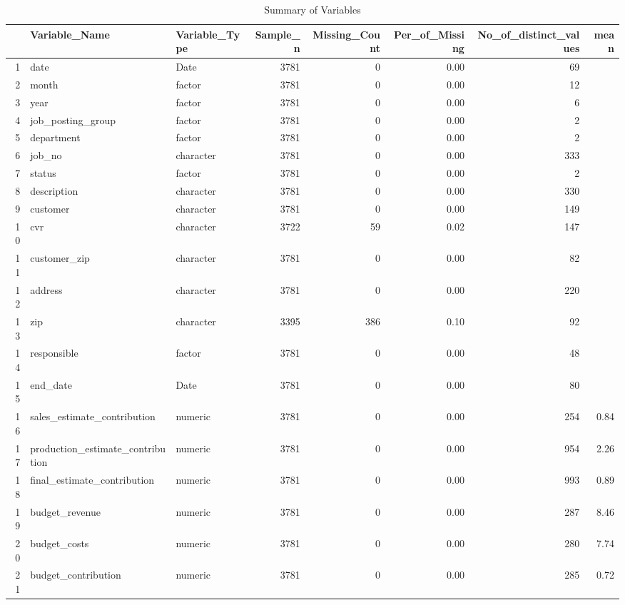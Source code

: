\begin{sidewaystable}[ht]
\centering
\caption{Summary of Variables} 
\begin{tabular}{rllrrrrr}
  \hline
 & Variable\_Name & Variable\_Type & Sample\_n & Missing\_Count & Per\_of\_Missing & No\_of\_distinct\_values & mean \\ 
  \hline
1 & date & Date & 3781 &   0 & 0.00 &  69 &  \\ 
  2 & month & factor & 3781 &   0 & 0.00 &  12 &  \\ 
  3 & year & factor & 3781 &   0 & 0.00 &   6 &  \\ 
  4 & job\_posting\_group & factor & 3781 &   0 & 0.00 &   2 &  \\ 
  5 & department & factor & 3781 &   0 & 0.00 &   2 &  \\ 
  6 & job\_no & character & 3781 &   0 & 0.00 & 333 &  \\ 
  7 & status & factor & 3781 &   0 & 0.00 &   2 &  \\ 
  8 & description & character & 3781 &   0 & 0.00 & 330 &  \\ 
  9 & customer & character & 3781 &   0 & 0.00 & 149 &  \\ 
  10 & cvr & character & 3722 &  59 & 0.02 & 147 &  \\ 
  11 & customer\_zip & character & 3781 &   0 & 0.00 &  82 &  \\ 
  12 & address & character & 3781 &   0 & 0.00 & 220 &  \\ 
  13 & zip & character & 3395 & 386 & 0.10 &  92 &  \\ 
  14 & responsible & factor & 3781 &   0 & 0.00 &  48 &  \\ 
  15 & end\_date & Date & 3781 &   0 & 0.00 &  80 &  \\ 
  16 & sales\_estimate\_contribution & numeric & 3781 &   0 & 0.00 & 254 & 0.84 \\ 
  17 & production\_estimate\_contribution & numeric & 3781 &   0 & 0.00 & 954 & 2.26 \\ 
  18 & final\_estimate\_contribution & numeric & 3781 &   0 & 0.00 & 993 & 0.89 \\ 
  19 & budget\_revenue & numeric & 3781 &   0 & 0.00 & 287 & 8.46 \\ 
  20 & budget\_costs & numeric & 3781 &   0 & 0.00 & 280 & 7.74 \\ 
  21 & budget\_contribution & numeric & 3781 &   0 & 0.00 & 285 & 0.72 \\ 

\end{tabular}
\end{sidewaystable}

